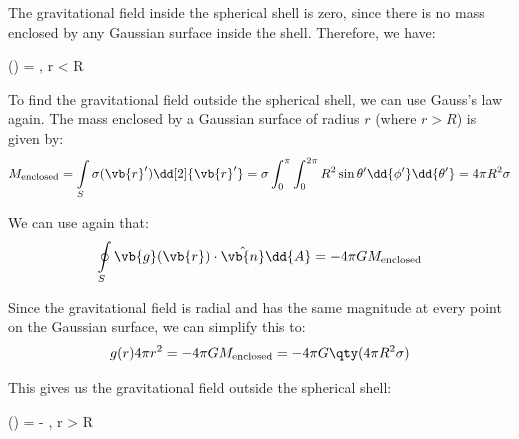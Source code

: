 The gravitational field inside the spherical shell is zero, since there is no mass enclosed by any Gaussian surface inside the shell. Therefore, we have:
\begin{answer}
    () = , \quad {} r < R
\end{answer}

To find the gravitational field outside the spherical shell, we can use Gauss's law again. The mass enclosed by a Gaussian surface of radius $r$ (where $r > R$) is given by:
\begin{equation*}
    M_{\text{enclosed}} = \int\limits_{S} \sigma(\vb{r}') \dd[2]{\vb{r}'} = \sigma \int_{0}^{\pi} \int_{0}^{2\pi} R^{2} \sin\theta' \dd{\phi'} \dd{\theta'} = 4\pi R^{2} \sigma
\end{equation*}

We can use again that:
\begin{equation*}
    \oint\limits_{S} \vb{g}(\vb{r}) \cdot \hat{\vb{n}} \dd{A} = -4\pi G M_{\text{enclosed}}
\end{equation*}

Since the gravitational field is radial and has the same magnitude at every point on the Gaussian surface, we can simplify this to:
\begin{equation*}
    g(r) 4\pi r^{2} = -4\pi G M_{\text{enclosed}} = -4\pi G \qty(4\pi R^{2} \sigma)
\end{equation*}

This gives us the gravitational field outside the spherical shell:
\begin{answer}
    () = - , \quad {} r > R
\end{answer}    

\endex